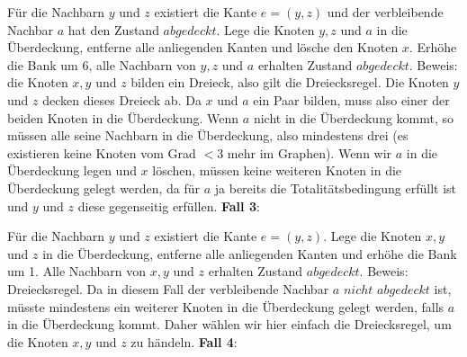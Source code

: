 \documentclass[12pt,onecolumn, notitlepage]{scrartcl}
\begin{document}
Für die Nachbarn $y$ und $z$ existiert die Kante $e = (y,z)$ und der verbleibende Nachbar $a$ hat den Zustand $abgedeckt$.  Lege die Knoten $y,z$ und $a$ in die Überdeckung, entferne alle anliegenden Kanten und lösche den Knoten $x$. Erhöhe die Bank um 6, alle Nachbarn von $y,z$ und $a$ erhalten Zustand $abgedeckt$.  \newline
Beweis: die Knoten $x,y$ und $z$ bilden ein Dreieck, also gilt die Dreiecksregel. Die Knoten $y$ und $z$ decken dieses Dreieck ab. Da $x$ und $a$ ein Paar bilden, muss also einer der beiden Knoten in die Überdeckung. Wenn $a$ nicht in die Überdeckung kommt, so müssen alle seine Nachbarn in die Überdeckung, also mindestens drei (es existieren keine Knoten vom Grad $<3$ mehr im Graphen). Wenn wir $a$ in die Überdeckung legen und $x$ löschen, müssen keine weiteren Knoten in die Überdeckung gelegt werden, da für $a$ ja bereits die Totalitätsbedingung erfüllt ist und $y$ und $z$ diese gegenseitig erfüllen. \newline \newpage
\textbf{Fall 3}: \newline
\begin{center}
\end{center}
Für die Nachbarn $y$ und $z$ existiert die Kante $e = (y,z)$. Lege die Knoten $x,y$ und $z$ in die Überdeckung, entferne alle anliegenden Kanten und erhöhe die Bank um 1. Alle Nachbarn von $x,y$ und $z$ erhalten Zustand $abgedeckt$.  \newline
Beweis: Dreiecksregel. Da in diesem Fall der verbleibende Nachbar $a$ $nicht$ $abgedeckt$ ist, müsste mindestens ein weiterer Knoten in die Überdeckung gelegt werden, falls $a$ in die Überdeckung kommt. Daher wählen wir hier einfach die Dreiecksregel, um die Knoten $x,y$ und $z$ zu händeln.\newline\newline 
\textbf{Fall 4}: \newline
\begin{center}
\end{center}
\end{document}
